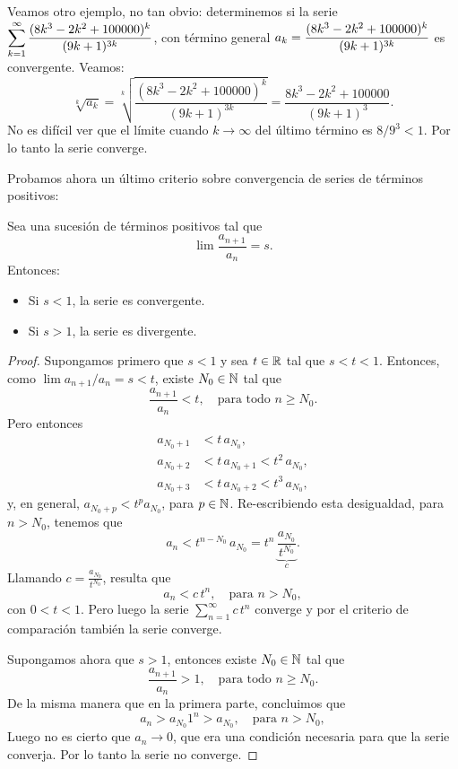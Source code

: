 Veamos otro ejemplo, no tan obvio:
determinemos si la serie
$\displaystyle\sum_{k=1}^\infty \frac{(8k^3-2k^2+100000)^{k}}{(9k+1)^{3k}}$,
con término general $\displaystyle a_k = \frac{(8k^3-2k^2+100000)^{k}}{(9k+1)^{3k}}$
es convergente.
Veamos:
\[
\sqrt[k]{a_k} = \sqrt[k]{\frac{(8k^3-2k^2+100000)^{k}}{(9k+1)^{3k}}}
= \frac{8k^3-2k^2+100000}{(9k+1)^{3}}.
\]
No es difícil ver que el límite cuando $k\to\infty$ del último término es 
$8/9^3 < 1$. Por lo tanto la serie converge.


Probamos ahora un último criterio sobre convergencia de series de términos positivos:

\begin{proposition}
Sea \sucan una sucesión de términos positivos tal que
\[
\lim \frac{a_{n+1}}{a_n} = s.
\]
Entonces:
\begin{itemize}
    \item Si $s<1$, la serie \seriean es convergente.
    \item Si $s>1$, la serie \seriean es divergente.
\end{itemize}
\end{proposition}

\begin{proof}
    Supongamos primero que $s<1$ y sea $t\in\mathbb{R}$ tal que $s<t<1$.
    Entonces, como $\lim a_{n+1}/a_n = s < t$, existe $N_0\in\mathbb{N}$ tal que 
    \[
    \frac{a_{n+1}}{a_n} < t, \quad \text{para todo $n\ge N_0$}.
    \]
    Pero entonces
    \begin{align*}
    a_{N_0+1} &< t \, a_{N_0},\\
    a_{N_0+2} &< t \, a_{N_0+1} < t^2 \, a_{N_0},\\
    a_{N_0+3} &< t \, a_{N_0+2} < t^3 \, a_{N_0},
    \end{align*}
    y, en general, $a_{N_0+p} < t^p a_{N_0}$, para $p\in\mathbb{N}$.
    Re-escribiendo esta desigualdad, para $n>N_0$, tenemos que
    \[
    a_n < t^{n-N_0} \, a_{N_0} = t^n \, \underbrace{\frac{a_{N_0}}{t^{N_0}}}_{c}.
    \]
    Llamando $c= \frac{a_{N_0}}{t^{N_0}}$, resulta que 
    \[
    a_n < c\, t^n,\quad\text{para $n > N_0$},
    \]
    con $0<t<1$. Pero luego la serie $\sum_{n=1}^\infty c\,t^n$ converge y por el criterio de comparación también la serie \seriean converge.

    Supongamos ahora que $s>1$, entonces existe $N_0\in\mathbb{N}$ tal que 
    \[
    \frac{a_{n+1}}{a_n} > 1, \quad \text{para todo $n\ge N_0$}.
    \]
    De la misma manera que en la primera parte, concluimos que 
    \[
    a_n > a_{N_0} 1^n > a_{N_0}, \quad\text{para $n > N_0$},
    \]
    Luego no es cierto que $a_n \to 0$, que era una condición necesaria para que la serie \seriean converja.
    Por lo tanto la serie \seriean no converge.
\end{proof}


